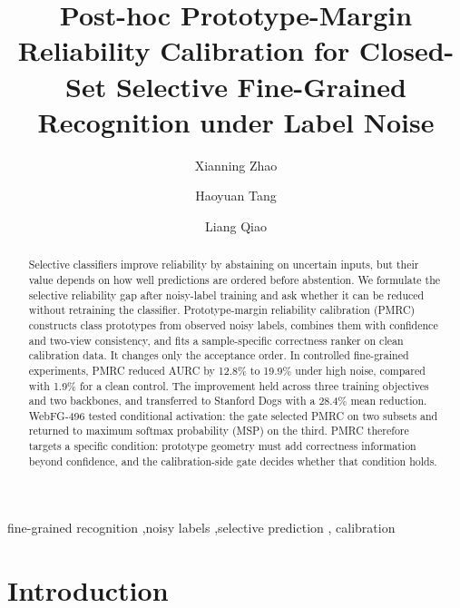 \documentclass[review,times]{elsarticle}
\begin{document}
\begin{frontmatter}

\title{Post-hoc Prototype-Margin Reliability Calibration for Closed-Set Selective Fine-Grained Recognition under Label Noise}

\author[inst1]{Xianning Zhao}

\author[inst1]{Haoyuan Tang}
\author[inst1]{Liang Qiao}


\begin{abstract}
\vspace{0.25em}\noindent
Selective classifiers improve reliability by abstaining on uncertain inputs,
but their value depends on how well predictions are ordered before abstention.
We formulate the selective reliability gap after noisy-label training and ask
whether it can be reduced without retraining the classifier. Prototype-margin
reliability calibration (PMRC) constructs class prototypes from observed noisy
labels, combines them with confidence and two-view consistency, and fits a
sample-specific correctness ranker on clean calibration data. It changes only
the acceptance order. In controlled fine-grained experiments, PMRC reduced
AURC by 12.8\% to 19.9\% under high noise, compared with 1.9\% for a clean
control. The improvement held across three training objectives and two
backbones, and transferred to Stanford Dogs with a 28.4\% mean reduction.
WebFG-496 tested conditional activation: the gate selected PMRC on two subsets
and returned to maximum softmax probability (MSP) on the third. PMRC therefore
targets a specific condition: prototype geometry must add correctness
information beyond confidence, and the calibration-side gate decides whether
that condition holds.
\end{abstract}

\begin{keyword}
fine-grained recognition \sep noisy labels \sep selective prediction \sep
calibration
\end{keyword}

\end{frontmatter}

\linenumbers
\pagestyle{plain}

\section{Introduction}
\end{document}
